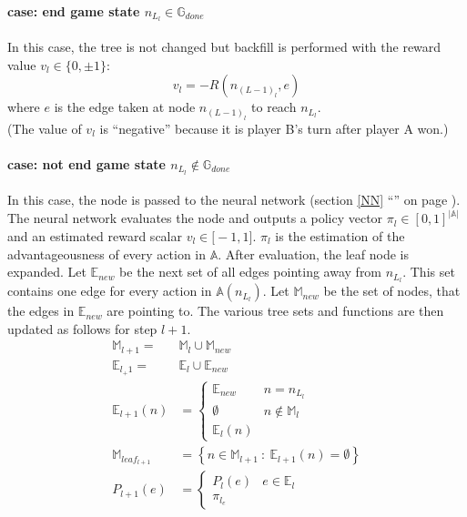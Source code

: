 \documentclass[12pt]{article}
\newcommand{\sectionref}[1]{section \ref{#1} ``\nameref{#1}'' on page \pageref{#1}}
\begin{document}
\paragraph*{case: end game state \(n_{L_l} \in \mathbb G_{done}\)}
In this case, the tree is not changed but backfill is performed with the reward value \(v_l \in \{0, \pm 1\}\):
\begin{equation}
v_l = -R(n_{(L-1)_l}, e)
\end{equation}
where \(e\) is the edge taken at node \(n_{(L-1)_l}\) to reach \(n_{L_l}\). \\
(The value of \(v_l\) is ``negative'' because it is player B's turn after player A won.)

\paragraph*{case: not end game state \(n_{L_l} \not\in \mathbb G_{done}\)}
In this case, the node is passed to the neural network (\sectionref{NN}). The neural network evaluates the node and outputs a policy vector \(\pi_l \in [0,1]^{|\mathbb A|}\) and an estimated reward scalar \(v_l \in \mathbb [-1,1]\). \(\pi_l\) is the estimation of the advantageousness of every action in \(\mathbb A\). After evaluation, the leaf node is expanded.
Let \(\mathbb E_{new}\) be the next set of all edges pointing away from \(n_{L_l}\). This set contains one edge for every action in \(\mathbb A(n_{L_l})\).
Let \(\mathbb M_{new}\) be the set of nodes, that the edges in \(\mathbb E_{new}\) are pointing to.
The various tree sets and functions are then updated as follows for step \(l+1\).
\begin{align}
\mathbb M_{l+1}   =& \mathbb M_l \cup \mathbb M_{new} \\
\mathbb E_{l_+1}  =& \mathbb E_l  \cup \mathbb E_{new} \\
%
\mathbb E_{l+1}(n) &= 
\left\{
\begin{matrix}
\mathbb E_{new} & n = n_{L_l}\\
\emptyset & n \not\in\mathbb M_l\\
\mathbb E_l(n)
\end{matrix}
\right.\\
%
\mathbb M_{leaf_{l+1}} &= \left\{n\in\mathbb M_{l+1}~:~\mathbb E_{l+1}(n) = \emptyset\right\}\\
%
P_{l+1}(e) &= 
\left\{
\begin{matrix}
P_l (e) & e \in\mathbb E_l\\
\pi_{l_e}&
\end{matrix}
\right.
\end{align}
\end{document}

